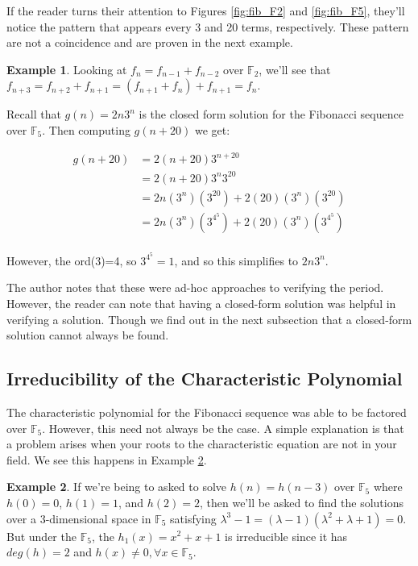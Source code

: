 \documentclass[a4paper]{article}
\theoremstyle{definition}
\newtheorem{example}{Example}[section]
\begin{document}
If the reader turns their attention to Figures \ref{fig:fib_F2} and \ref{fig:fib_F5}, they'll notice the
pattern that appears every 3 and 20 terms, respectively. These pattern are not a coincidence and are
proven in the next example.
\\

\begin{example}
Looking at $f_n=f_{n-1}+f_{n-2}$ over $\mathbb{F}_2$, we'll see that $f_{n+3}=f_{n+2}+f_{n+1}=(f_{n+1}+f_{n})+f_{n+1}=f_{n}$.

Recall that $g(n)=2n3^n$ is the closed form solution for the Fibonacci sequence over $\mathbb{F}_5$.
Then computing $g(n+20)$ we get:

\begin{align*}
g(n+20)
&=2(n+20)3^{n+20} \\
&=2(n+20)3^n3^{20} \\
&=2n(3^n)(3^{20})+2(20)(3^n)(3^{20}) \\
&=2n(3^n)(3^{4^{5}})+2(20)(3^n)(3^{4^{5}}) \\
\end{align*}

However, the ord($3$)=4, so $3^{4^{5}}=1$, and so this simplifies to $2n3^n$. 
\label{ex:period_fib_F5}
\end{example}

The author notes that these were ad-hoc approaches to verifying the period. However, the reader can note
that having a closed-form solution was helpful in verifying a solution. Though we find out in the next
subsection that a closed-form solution cannot always be found.

\subsection{Irreducibility of the Characteristic Polynomial}

The characteristic polynomial for the Fibonacci sequence was able to be factored over $\mathbb{F}_5$.
However, this need not always be the case. A simple explanation is that a problem arises when your roots
to the characteristic equation are not in your field. We see this happens in Example
\ref{ex:cubic-irred}.
\\

\begin{example}
If we're being to asked to solve $h(n)=h(n-3)$ over $\mathbb{F}_5$ where $h(0)=0$, $h(1)=1$, and $h(2)=2$, then we'll be asked to find the solutions over a 3-dimensional space in $\mathbb{F}_5$ satisfying $\lambda^{3}-1=(\lambda-1)(\lambda^2+\lambda+1)=0$. But under the $\mathbb{F}_5$, the $h_1(x)=x^2+x+1$ is irreducible since it has $deg(h)=2$ and $h(x)\ne 0, \forall x\in \mathbb{F}_5$. 
\label{ex:cubic-irred}
\end{example}
\end{document}
